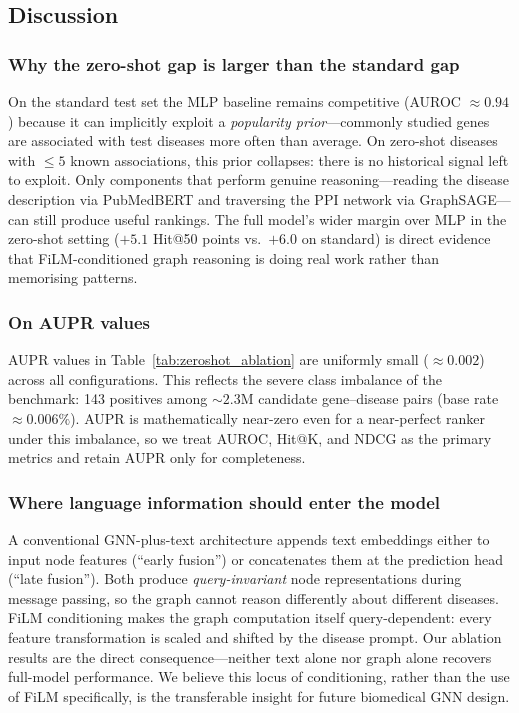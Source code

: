 \documentclass[conference]{IEEEtran}
\begin{document}
\subsection{Discussion}

\subsubsection{Why the zero-shot gap is larger than the standard gap}
On the standard test set the MLP baseline remains competitive (AUROC $\approx 0.94$) because it can implicitly exploit a \emph{popularity prior}---commonly studied genes are associated with test diseases more often than average. On zero-shot diseases with $\leq\!5$ known associations, this prior collapses: there is no historical signal left to exploit. Only components that perform genuine reasoning---reading the disease description via PubMedBERT and traversing the PPI network via GraphSAGE---can still produce useful rankings. The full model's wider margin over MLP in the zero-shot setting ($+5.1$ Hit@50 points vs.\ $+6.0$ on standard) is direct evidence that FiLM-conditioned graph reasoning is doing real work rather than memorising patterns.

\subsubsection{On AUPR values}
AUPR values in Table~\ref{tab:zeroshot_ablation} are uniformly small ($\approx 0.002$) across all configurations. This reflects the severe class imbalance of the benchmark: 143 positives among $\sim\!2.3\mathrm{M}$ candidate gene--disease pairs (base rate $\approx 0.006\%$). AUPR is mathematically near-zero even for a near-perfect ranker under this imbalance, so we treat AUROC, Hit@K, and NDCG as the primary metrics and retain AUPR only for completeness.

\subsubsection{Where language information should enter the model}
A conventional GNN-plus-text architecture appends text embeddings either to input node features (``early fusion'') or concatenates them at the prediction head (``late fusion''). Both produce \emph{query-invariant} node representations during message passing, so the graph cannot reason differently about different diseases. FiLM conditioning makes the graph computation itself query-dependent: every feature transformation is scaled and shifted by the disease prompt. Our ablation results are the direct consequence---neither text alone nor graph alone recovers full-model performance. We believe this locus of conditioning, rather than the use of FiLM specifically, is the transferable insight for future biomedical GNN design.
\end{document}
